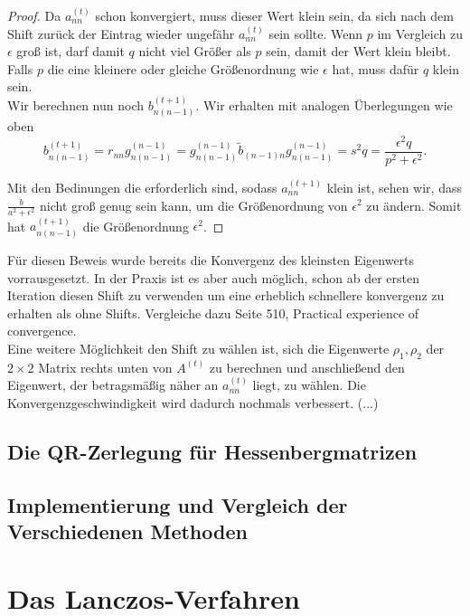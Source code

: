 \documentclass{article}
\begin{document}
\begin{proof}
Da $a^{(t)}_{nn}$ schon konvergiert, muss dieser Wert klein sein, da sich nach dem Shift zurück der Eintrag wieder ungefähr $a^{(t)}_{nn}$ sein sollte. Wenn $p$ im Vergleich zu $\epsilon$ groß ist, darf damit $q$ nicht viel Größer als $p$ sein, damit der Wert klein bleibt. Falls $p$ die eine kleinere oder gleiche Größenordnung wie $\epsilon$ hat, muss dafür $q$ klein sein.\\

Wir berechnen nun noch $b^{(t+1)}_{n(n-1)}$. Wir erhalten mit analogen Überlegungen wie oben 
\begin{equation*}
	b^{(t+1)}_{n(n-1)} = r_{nn} g^{(n-1)}_{n(n-1)} = g^{(n-1)}_{n(n-1)} \tilde{b}_{(n-1)n} g^{(n-1)}_{n(n-1)} = s^2q = \frac{\epsilon^2 q}{p^2+\epsilon^2}.
\end{equation*}

Mit den Bedinungen die erforderlich sind, sodass $a^{(t+1)}_{nn}$ klein ist, sehen wir, dass $\frac{b}{a^2+\epsilon^2}$ nicht groß genug sein kann, um die Größenordnung von $\epsilon^2$ zu ändern. Somit hat $a^{(t+1)}_{n(n-1)}$ die Größenordnung $\epsilon^2$.
\end{proof}

Für diesen Beweis wurde bereits die Konvergenz des kleinsten Eigenwerts vorrausgesetzt. In der Praxis ist es aber auch möglich, schon ab der ersten Iteration diesen Shift zu verwenden um eine erheblich schnellere konvergenz zu erhalten als ohne Shifts. Vergleiche dazu \cite{The Algebraic Eigenvalue Problem} Seite 510, Practical experience of convergence.\\

Eine weitere Möglichkeit den Shift zu wählen ist, sich die Eigenwerte $\rho_1, \rho_2$ der $2 \times 2$ Matrix rechts unten von $A^{(t)}$ zu berechnen und anschließend den Eigenwert, der betragsmäßig näher an $a^{(t)}_{nn}$ liegt, zu wählen. Die Konvergenzgeschwindigkeit wird dadurch nochmals verbessert. (...)


\subsection{Die QR-Zerlegung für Hessenbergmatrizen}

\subsection{Implementierung und Vergleich der Verschiedenen Methoden}


\section{Das Lanczos-Verfahren}
\end{document}
